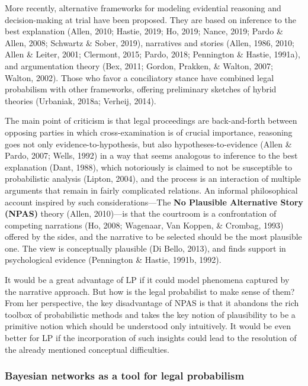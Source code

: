 \documentclass[11pt,dvipsnames,enabledeprecatedfontcommands]{scrartcl}
\begin{document}
More recently, alternative frameworks for modeling evidential reasoning
and decision-making at trial have been proposed. They are based on
inference to the best explanation (Allen, 2010; Hastie, 2019; Ho, 2019;
Nance, 2019; Pardo \& Allen, 2008; Schwartz \& Sober, 2019), narratives
and stories (Allen, 1986, 2010; Allen \& Leiter, 2001; Clermont, 2015;
Pardo, 2018; Pennington \& Hastie, 1991a), and argumentation theory
(Bex, 2011; Gordon, Prakken, \& Walton, 2007; Walton, 2002). Those who
favor a conciliatory stance have combined legal probabilism with other
frameworks, offering preliminary sketches of hybrid theories (Urbaniak,
2018a; Verheij, 2014).

The main point of criticism is that legal proceedings are back-and-forth
between opposing parties in which cross-examination is of crucial
importance, reasoning goes not only evidence-to-hypothesis, but also
hypotheses-to-evidence (Allen \& Pardo, 2007; Wells, 1992) in a way that
seems analogous to inference to the best explanation (Dant, 1988), which
notoriously is claimed to not be susceptible to probabilistic analysis
(Lipton, 2004), and the process is an interaction of multiple arguments
that remain in fairly complicated relations. An informal philosophical
account inspired by such considerations---The
\textbf{No Plausible Alternative Story (NPAS)} theory (Allen, 2010)---is
that the courtroom is a confrontation of competing narrations (Ho, 2008;
Wagenaar, Van Koppen, \& Crombag, 1993) offered by the sides, and the
narrative to be selected should be the most plausible one. The view is
conceptually plausible (Di Bello, 2013), and finds support in
psychological evidence (Pennington \& Hastie, 1991b, 1992).

It would be a great advantage of LP if it could model phenomena captured
by the narrative approach. But how is the legal probabilist to make
sense of them? From her perspective, the key disadvantage of NPAS is
that it abandons the rich toolbox of probabilistic methods and takes the
key notion of plausibility to be a primitive notion which should be
understood only intuitively. It would be even better for LP if the
incorporation of such insights could lead to the resolution of the
already mentioned conceptual difficulties.

\hypertarget{bayesian-networks-as-a-tool-for-legal-probabilism}{%
\subsubsection{Bayesian networks as a tool for legal
probabilism}\label{bayesian-networks-as-a-tool-for-legal-probabilism}}
\end{document}
